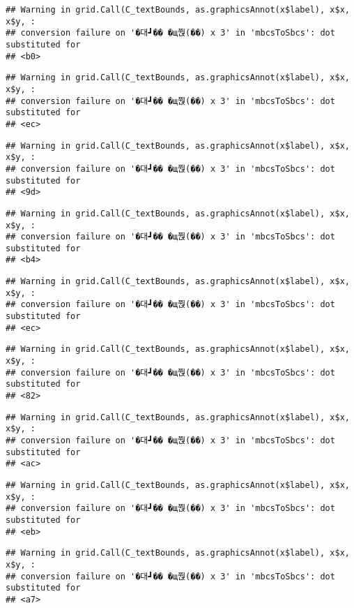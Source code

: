 \documentclass[
]{article}
\begin{document}
\begin{verbatim}
## Warning in grid.Call(C_textBounds, as.graphicsAnnot(x$label), x$x, x$y, :
## conversion failure on '�대┛�� �щ쭩(��) x 3' in 'mbcsToSbcs': dot substituted for
## <b0>
\end{verbatim}

\begin{verbatim}
## Warning in grid.Call(C_textBounds, as.graphicsAnnot(x$label), x$x, x$y, :
## conversion failure on '�대┛�� �щ쭩(��) x 3' in 'mbcsToSbcs': dot substituted for
## <ec>
\end{verbatim}

\begin{verbatim}
## Warning in grid.Call(C_textBounds, as.graphicsAnnot(x$label), x$x, x$y, :
## conversion failure on '�대┛�� �щ쭩(��) x 3' in 'mbcsToSbcs': dot substituted for
## <9d>
\end{verbatim}

\begin{verbatim}
## Warning in grid.Call(C_textBounds, as.graphicsAnnot(x$label), x$x, x$y, :
## conversion failure on '�대┛�� �щ쭩(��) x 3' in 'mbcsToSbcs': dot substituted for
## <b4>
\end{verbatim}

\begin{verbatim}
## Warning in grid.Call(C_textBounds, as.graphicsAnnot(x$label), x$x, x$y, :
## conversion failure on '�대┛�� �щ쭩(��) x 3' in 'mbcsToSbcs': dot substituted for
## <ec>
\end{verbatim}

\begin{verbatim}
## Warning in grid.Call(C_textBounds, as.graphicsAnnot(x$label), x$x, x$y, :
## conversion failure on '�대┛�� �щ쭩(��) x 3' in 'mbcsToSbcs': dot substituted for
## <82>
\end{verbatim}

\begin{verbatim}
## Warning in grid.Call(C_textBounds, as.graphicsAnnot(x$label), x$x, x$y, :
## conversion failure on '�대┛�� �щ쭩(��) x 3' in 'mbcsToSbcs': dot substituted for
## <ac>
\end{verbatim}

\begin{verbatim}
## Warning in grid.Call(C_textBounds, as.graphicsAnnot(x$label), x$x, x$y, :
## conversion failure on '�대┛�� �щ쭩(��) x 3' in 'mbcsToSbcs': dot substituted for
## <eb>
\end{verbatim}

\begin{verbatim}
## Warning in grid.Call(C_textBounds, as.graphicsAnnot(x$label), x$x, x$y, :
## conversion failure on '�대┛�� �щ쭩(��) x 3' in 'mbcsToSbcs': dot substituted for
## <a7>
\end{verbatim}
\end{document}
